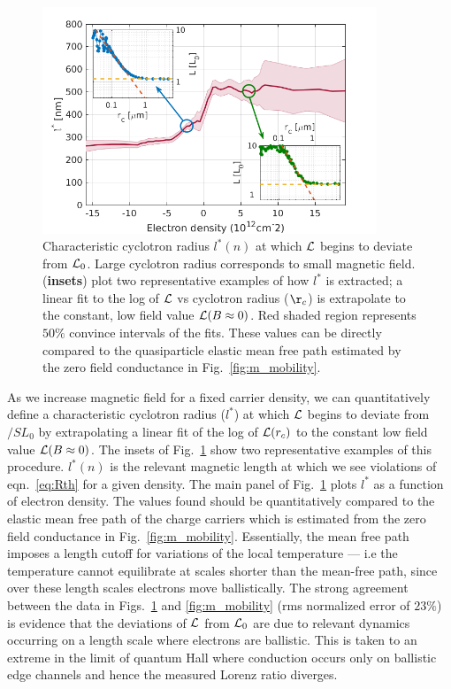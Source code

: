 \begin{figure}
\centering
\includegraphics[width=100mm]{figures/magneto/r_cyc.png}
\caption{Characteristic cyclotron radius $l^*(n)$ at which $\mathcal{L}$ begins to deviate from $\mathcal{L}_0$. Large cyclotron radius corresponds to small magnetic field. (\textbf{insets}) plot two representative examples of how $l^*$ is extracted; a linear fit to the log of $\mathcal{L}$ vs cyclotron radius ($\r_c$) is extrapolate to the constant, low field value $\mathcal{L}(B\approx0)$. Red shaded region represents $50\%$ convince intervals of the fits. These values can be directly compared to the quasiparticle elastic mean free path estimated by the zero field conductance in Fig.~\ref{fig:m_mobility}.}
\label{fig:m_cyc}
\end{figure}
As we increase magnetic field for a fixed carrier density, we can quantitatively define a characteristic cyclotron radius ($l^*$) at which $\mathcal{L}$ begins to deviate from $/SL_0$ by extrapolating a linear fit of the log of $\mathcal{L}(r_c)$ to the constant low field value $\mathcal{L}(B\approx0)$. The insets of Fig.~\ref{fig:m_cyc} show two representative examples of this procedure. $l^*(n)$ is the relevant magnetic length at which we see violations of eqn.~\ref{eq:Rth} for a given density. The main panel of Fig.~\ref{fig:m_cyc} plots $l^*$ as a function of electron density. The values found should be quantitatively compared to the elastic mean free path of the charge carriers which is estimated from the zero field conductance in Fig.~\ref{fig:m_mobility}. Essentially, the mean free path imposes a length cutoff for variations of the local temperature --- i.e the temperature cannot equilibrate at scales shorter than the mean-free path, since over these length scales electrons move ballistically. The strong agreement between the data in Figs.~\ref{fig:m_cyc} and \ref{fig:m_mobility} (rms normalized error of $23\%$) is evidence that the deviations of $\mathcal{L}$ from $\mathcal{L}_0$ are due to relevant dynamics occurring on a length scale where electrons are ballistic. This is taken to an extreme in the limit of quantum Hall where conduction occurs only on ballistic edge channels and hence the measured Lorenz ratio diverges.

